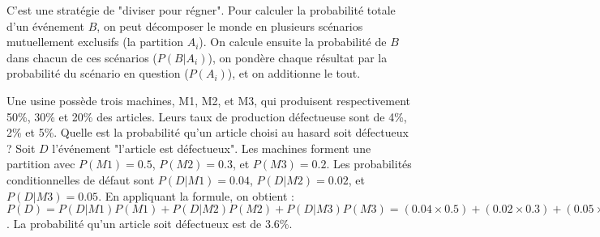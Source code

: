 \begin{intuitionbox}
C'est une stratégie de "diviser pour régner". Pour calculer la probabilité totale d'un événement $B$, on peut décomposer le monde en plusieurs scénarios mutuellement exclusifs (la partition $A_i$). On calcule ensuite la probabilité de $B$ dans chacun de ces scénarios ($P(B|A_i)$), on pondère chaque résultat par la probabilité du scénario en question ($P(A_i)$), et on additionne le tout.

\begin{center}
\end{center}
\end{intuitionbox}

\begin{examplebox}
Une usine possède trois machines, M1, M2, et M3, qui produisent respectivement 50\%, 30\% et 20\% des articles. Leurs taux de production défectueuse sont de 4\%, 2\% et 5\%. Quelle est la probabilité qu'un article choisi au hasard soit défectueux ?
Soit $D$ l'événement "l'article est défectueux". Les machines forment une partition avec $P(M1)=0.5$, $P(M2)=0.3$, et $P(M3)=0.2$. Les probabilités conditionnelles de défaut sont $P(D|M1)=0.04$, $P(D|M2)=0.02$, et $P(D|M3)=0.05$.
En appliquant la formule, on obtient :
$P(D) = P(D|M1)P(M1) + P(D|M2)P(M2) + P(D|M3)P(M3) = (0.04 \times 0.5) + (0.02 \times 0.3) + (0.05 \times 0.2) = 0.02 + 0.006 + 0.01 = 0.036$.
La probabilité qu'un article soit défectueux est de 3.6\%.
\end{examplebox}

